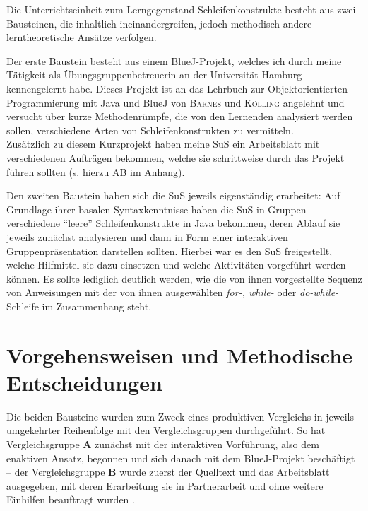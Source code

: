 \documentclass[paper=a4, DIV=13, BCOR=12mm, twoside=on, onecolumn=on, open = any, titlepage =on, parskip =half-, headsepline = on, footsepline = on, chapterprefix = on, sectionprefix = on, appendixprefix = off, fontsize = 11pt, numbers = noenddot, abstract = off]{scrreprt}
\begin{document}
Die Unterrichtseinheit zum Lerngegenstand Schleifenkonstrukte besteht aus zwei Bausteinen, die inhaltlich ineinandergreifen, jedoch methodisch andere lerntheoretische Ansätze verfolgen.

Der erste Baustein besteht aus einem BlueJ-Projekt, welches ich durch meine Tätigkeit als Übungsgruppenbetreuerin an der Universität Hamburg kennengelernt habe. Dieses Projekt ist an das Lehrbuch zur Objektorientierten Programmierung mit Java und BlueJ von \textsc{Barnes} und \textsc{Kölling} angelehnt und versucht über kurze Methodenrümpfe, die von den Lernenden analysiert werden sollen, verschiedene Arten von Schleifenkonstrukten zu vermitteln.\\
Zusätzlich zu diesem Kurzprojekt haben meine SuS ein Arbeitsblatt mit verschiedenen Aufträgen bekommen, welche sie schrittweise durch das Projekt führen sollten (s. hierzu AB im Anhang). 

Den zweiten Baustein haben sich die SuS jeweils eigenständig erarbeitet: Auf Grundlage ihrer basalen Syntaxkenntnisse haben die SuS in Gruppen verschiedene "`leere"' Schleifenkonstrukte in Java bekommen, deren Ablauf sie jeweils zunächst analysieren und dann in Form einer interaktiven Gruppenpräsentation darstellen sollten. Hierbei war es den SuS freigestellt, welche Hilfmittel sie dazu einsetzen und welche Aktivitäten vorgeführt werden können. Es sollte lediglich deutlich werden, wie die von ihnen vorgestellte Sequenz von Anweisungen mit der von ihnen ausgewählten \emph{for-, while-} oder \emph{do-while-}Schleife im Zusammenhang steht.

\par \singlespacing
 \section{Vorgehensweisen und Methodische Entscheidungen}
 \label{sec:vorgehensweisen}
\onehalfspacing

Die beiden Bausteine wurden zum Zweck eines produktiven Vergleichs in jeweils umgekehrter Reihenfolge mit den Vergleichsgruppen durchgeführt. So hat Vergleichsgruppe \textsc{\textbf{A}} zunächst mit der interaktiven Vorführung, also dem enaktiven Ansatz, begonnen und sich danach mit dem BlueJ-Projekt beschäftigt -- der Vergleichsgruppe \textsc{\textbf{B}} wurde zuerst der Quelltext und das Arbeitsblatt ausgegeben, mit deren Erarbeitung sie in Partnerarbeit und ohne weitere Einhilfen beauftragt wurden .
\end{document}
